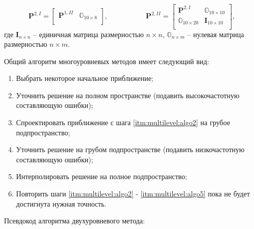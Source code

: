 \documentclass[a4paper,14pt]{article}
\begin{document}
\begin{equation*}
	\mathbf{P}^{2,I} = \left[
	\begin{matrix}
		\mathbf{P}^{1,II} & \mathbb{O}_{10 \times 8} \\
	\end{matrix}
	\right],
\text{~~~~~~~~~~~~~~~~}
	\mathbf{P}^{2,II} = \left[
	\begin{matrix}
		\mathbf{P}^{2,I} & \mathbb{O}_{10 \times 10} \\
		\mathbb{O}_{10 \times 20} & \mathbf{I}_{10 \times 10} \\
	\end{matrix}
	\right],
\end{equation*}
где $\mathbf{I}_{n \times n}$ -- единичная матрица размерностью $n \times n$, $\mathbb{O}_{n \times m}$ -- нулевая матрица размерностью $n \times m$.

\pagebreak
Общий алгоритм многоуровневых методов имеет следующий вид:
\begin{enumerate}
	\item \label{itm:multilevel:algo1} Выбрать некоторое начальное приближение;
	\item \label{itm:multilevel:algo2} Уточнить решение на полном пространстве (подавить высокочастотную составляющую ошибки);
	\item \label{itm:multilevel:algo3} Спроектировать приближение с шага \ref{itm:multilevel:algo2} на грубое подпространство;
	\item \label{itm:multilevel:algo4} Уточнить решение на грубом подпространстве (подавить низкочастотную составляющую ошибки);
	\item \label{itm:multilevel:algo5} Интерполировать решение на полное подпространство;
	\item \label{itm:multilevel:algo6} Повторить шаги \ref{itm:multilevel:algo2} - \ref{itm:multilevel:algo5} пока не будет достигнута нужная точность.
\end{enumerate}

Псевдокод алгоритма двухуровневого метода:
\end{document}
